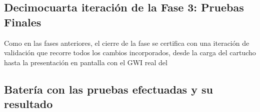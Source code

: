 \subsection{Decimocuarta iteración de la Fase 3: Pruebas Finales}
\label{subsec:VerificacionF3}

Como en las fases anteriores, el cierre de la fase se certifica con una
iteración de validación que recorre todos los cambios incorporados, desde la
carga del cartucho hasta la presentación en pantalla con el GWI real del

\subsection{Batería con las pruebas efectuadas y su resultado}
\label{sec:BateriaPruebasFase3}


